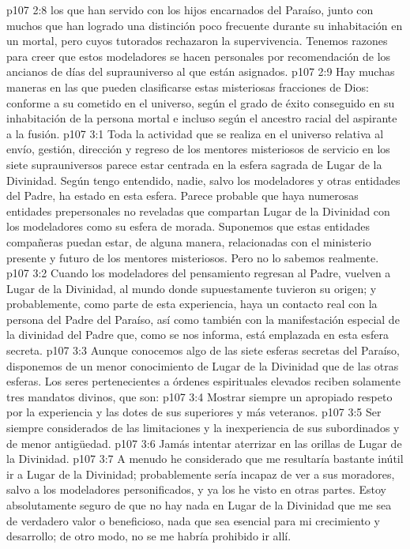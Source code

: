 \vs p107 2:8  los que han servido con los hijos encarnados del Paraíso, junto con muchos que han logrado una distinción poco frecuente durante su inhabitación en un mortal, pero cuyos tutorados rechazaron la supervivencia. Tenemos razones para creer que estos modeladores se hacen personales por recomendación de los ancianos de días del suprauniverso al que están asignados.
\vs p107 2:9 \pc Hay muchas maneras en las que pueden clasificarse estas misteriosas fracciones de Dios: conforme a su cometido en el universo, según el grado de éxito conseguido en su inhabitación de la persona mortal e incluso según el ancestro racial del aspirante a la fusión.
\vs p107 3:1 Toda la actividad que se realiza en el universo relativa al envío, gestión, dirección y regreso de los mentores misteriosos de servicio en los siete suprauniversos parece estar centrada en la esfera sagrada de Lugar de la Divinidad. Según tengo entendido, nadie, salvo los modeladores y otras entidades del Padre, ha estado en esta esfera. Parece probable que haya numerosas entidades prepersonales no reveladas que compartan Lugar de la Divinidad con los modeladores como su esfera de morada. Suponemos que estas entidades compañeras puedan estar, de alguna manera, relacionadas con el ministerio presente y futuro de los mentores misteriosos. Pero no lo sabemos realmente.
\vs p107 3:2 Cuando los modeladores del pensamiento regresan al Padre, vuelven a Lugar de la Divinidad, al mundo donde supuestamente tuvieron su origen; y probablemente, como parte de esta experiencia, haya un contacto real con la persona del Padre del Paraíso, así como también con la manifestación especial de la divinidad del Padre que, como se nos informa, está emplazada en esta esfera secreta.
\vs p107 3:3 Aunque conocemos algo de las siete esferas secretas del Paraíso, disponemos de un menor conocimiento de Lugar de la Divinidad que de las otras esferas. Los seres pertenecientes a órdenes espirituales elevados reciben solamente tres mandatos divinos, que son:
\vs p107 3:4 Mostrar siempre un apropiado respeto por la experiencia y las dotes de sus superiores y más veteranos.
\vs p107 3:5 Ser siempre considerados de las limitaciones y la inexperiencia de sus subordinados y de menor antigüedad.
\vs p107 3:6 Jamás intentar aterrizar en las orillas de Lugar de la Divinidad.
\vs p107 3:7 A menudo he considerado que me resultaría bastante inútil ir a Lugar de la Divinidad; probablemente sería incapaz de ver a sus moradores, salvo a los modeladores personificados, y ya los he visto en otras partes. Estoy absolutamente seguro de que no hay nada en Lugar de la Divinidad que me sea de verdadero valor o beneficioso, nada que sea esencial para mi crecimiento y desarrollo; de otro modo, no se me habría prohibido ir allí.
